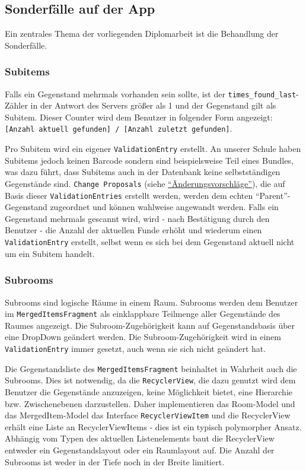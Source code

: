 \hypertarget{sonderfuxe4lle-auf-der-app}{%
\subsection{Sonderfälle auf der App}\label{sonderfuxe4lle-auf-der-app}}

Ein zentrales Thema der vorliegenden Diplomarbeit ist die Behandlung der
Sonderfälle.

\hypertarget{subitems}{%
\subsubsection{Subitems}\label{subitems}}

Falls ein Gegenstand mehrmals vorhanden sein sollte, ist der
\texttt{times\_found\_last}-Zähler in der Antwort des Servers größer als
1 und der Gegenstand gilt als Subitem. Dieser Counter wird dem Benutzer
in folgender Form angezeigt:
\texttt{{[}Anzahl\ aktuell\ gefunden{]}\ /\ {[}Anzahl\ zuletzt\ gefunden{]}}.

Pro Subitem wird ein eigener \texttt{ValidationEntry} erstellt. An
unserer Schule haben Subitems jedoch keinen Barcode sondern sind
beispielsweise Teil eines Bundles, was dazu führt, dass Subitems auch in
der Datenbank keine selbstständigen Gegenstände sind.
\texttt{Change\ Proposals} (siehe
\protect\hyperlink{uxe4nderungsvorschluxe4ge}{``Änderungsvorschläge''}),
die auf Basis dieser \texttt{ValidationEntries} erstellt werden, werden
dem echten ``Parent''-Gegenstand zugeordnet und können wahlweise
angewandt werden. Falls ein Gegenstand mehrmals gescannt wird, wird -
nach Bestätigung durch den Benutzer - die Anzahl der aktuellen Funde
erhöht und wiederum einen \texttt{ValidationEntry} erstellt, selbst wenn
es sich bei dem Gegenstand aktuell nicht um ein Subitem handelt.

\hypertarget{subrooms}{%
\subsubsection{Subrooms}\label{subrooms}}

Subrooms sind logische Räume in einem Raum. Subrooms werden dem Benutzer
im \texttt{MergedItemsFragment} als einklappbare Teilmenge aller
Gegenstände des Raumes angezeigt. Die Subroom-Zugehörigkeit kann auf
Gegenstandsbasis über eine DropDown geändert werden. Die
Subroom-Zugehörigkeit wird in einem \texttt{ValidationEntry} immer
gesetzt, auch wenn sie sich nicht geändert hat.

Die Gegenstandsliste des \texttt{MergedItemsFragment} beinhaltet in
Wahrheit auch die Subrooms. Dies ist notwendig, da die
\texttt{RecyclerView}, die dazu genutzt wird dem Benutzer die
Gegenstände anzuzeigen, keine Möglichkeit bietet, eine Hierarchie bzw.
Zwischenebenen darzustellen. Daher implementieren das Room-Model und das
MergedItem-Model das Interface \texttt{RecyclerViewItem} und die
RecyclerView erhält eine Liste an RecyclerViewItems - dies ist ein
typisch polymorpher Ansatz. Abhängig vom Typen des aktuellen
Listenelements baut die RecyclerView entweder ein Gegenstandslayout oder
ein Raumlayout auf. Die Anzahl der Subrooms ist weder in der Tiefe noch
in der Breite limitiert.

